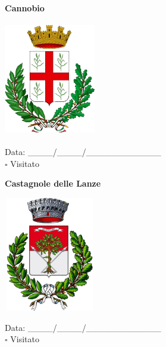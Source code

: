\documentclass[a5paper,12pt]{article}
\begin{document}
\vspace{0.7cm}

\noindent
\begin{minipage}[t]{0.45\textwidth}
    \begin{center}
        \textbf{Cannobio}
    \end{center}
    \vspace{-0.5cm} %
    \begin{center}
        \includegraphics[height= 5cm, width=4cm]{Piemonte/Stemma Cannobio.png}
    \end{center}
    \vspace{-0.4cm} %
    \begin{flushleft}
        Data: \_\_\_\_/\_\_\_\_/\_\_\_\_\_\_\_\_\_\_\_\_ \\
        $\square$ Visitato
    \end{flushleft}
\end{minipage}
\hfill
\noindent
\begin{minipage}[t]{0.45\textwidth}
    \begin{center}
        \textbf{Castagnole delle Lanze}
    \end{center}
    \vspace{-0.5cm} %
    \begin{center}
        \includegraphics[height= 5cm, width=4cm]{Piemonte/Stemma Castagnole delle Lanze.png}
    \end{center}
    \vspace{-0.4cm} %
    \begin{flushleft}
        Data: \_\_\_\_/\_\_\_\_/\_\_\_\_\_\_\_\_\_\_\_\_ \\
        $\square$ Visitato
    \end{flushleft}
\end{minipage}
\end{document}
